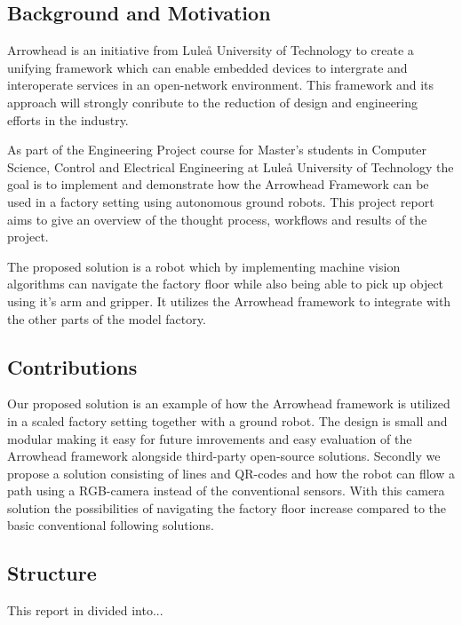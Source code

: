 \subsection{Background and Motivation}
Arrowhead is an initiative from Luleå University of Technology to create a unifying framework which can enable embedded devices to intergrate and interoperate services in an open-network environment. This framework and its approach will strongly conribute to the reduction of design and engineering efforts in the industry. 

As part of the Engineering Project course for Master's students in Computer Science, Control and Electrical Engineering at Luleå University of Technology the goal is to implement and demonstrate how the Arrowhead Framework can be used in a factory setting using autonomous ground robots. This project report aims to give an overview of the thought process, workflows and results of the project.

The proposed solution is a robot which by implementing machine vision algorithms can navigate the factory floor while also being able to pick up object using it's arm and gripper. It utilizes the Arrowhead framework to integrate with the other parts of the model factory. 

\subsection{Contributions}
Our proposed solution is an example of how the Arrowhead framework is utilized in a scaled factory setting together with a ground robot. The design is small and modular making it easy for future imrovements and easy evaluation of the Arrowhead framework alongside third-party open-source solutions. Secondly we propose a solution consisting of lines and QR-codes and how the robot can fllow a path using a RGB-camera instead of the conventional sensors. With this camera solution the possibilities of navigating the factory floor increase compared to the basic conventional following solutions.  

\subsection{Structure}
This report in divided into...